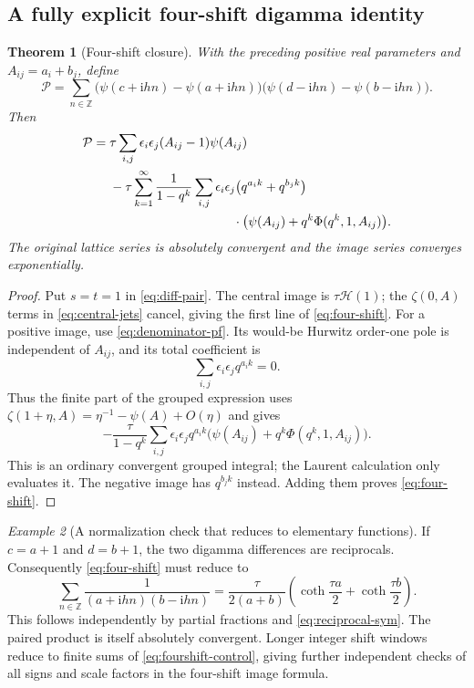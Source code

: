 \documentclass[11pt,a4paper]{article}
\numberwithin{equation}{section}
\newtheorem{theorem}{Theorem}[section]
\theoremstyle{definition}
\theoremstyle{remark}
\newtheorem{example}[theorem]{Example}
\newcommand{\ii}{\mathrm i}
\newcommand{\Z}{\mathbb Z}
\begin{document}
\subsection{A fully explicit four-shift digamma identity}
\begin{theorem}[Four-shift closure]\label{thm:fourshift}
With the preceding positive real parameters and
$A_{ij}=a_i+b_j$, define
\[
 \mathcal P=\sum_{n\in\Z}
   \bigl(\psi(c+\ii hn)-\psi(a+\ii hn)\bigr)
   \bigl(\psi(d-\ii hn)-\psi(b-\ii hn)\bigr).
\]
Then
\begin{equation}\label{eq:four-shift}
 \begin{split}
 \mathcal P={}&\tau\sum_{i,j}\epsilon_i\epsilon_j
                             (A_{ij}-1)\psi(A_{ij})\\
 &-\tau\sum_{k=1}^\infty\frac1{1-q^k}
     \sum_{i,j}\epsilon_i\epsilon_j
       \bigl(q^{a_i k}+q^{b_j k}\bigr)\\
 &\hspace{34mm}\cdot
        \bigl(\psi(A_{ij})+q^k\Phi(q^k,1,A_{ij})\bigr).
 \end{split}
\end{equation}
The original lattice series is absolutely convergent and the image
series converges exponentially.
\end{theorem}
\begin{proof}
Put $s=t=1$ in \eqref{eq:diff-pair}. The central image is
$\tau\mathcal H(1)$; the $\zeta(0,A)$ terms in
\eqref{eq:central-jets} cancel, giving the first line of
\eqref{eq:four-shift}. For a positive image, use
\eqref{eq:denominator-pf}. Its would-be Hurwitz order-one pole is
independent of $A_{ij}$, and its total coefficient is
\[
 \sum_{i,j}\epsilon_i\epsilon_j q^{a_i k}=0.
\]
Thus the finite part of the grouped expression uses
$\zeta(1+\eta,A)=\eta^{-1}-\psi(A)+O(\eta)$ and gives
\[
 -\frac{\tau}{1-q^k}\sum_{i,j}\epsilon_i\epsilon_j q^{a_i k}
            \bigl(\psi(A_{ij})+q^k\Phi(q^k,1,A_{ij})\bigr).
\]
This is an ordinary convergent grouped integral; the Laurent
calculation only evaluates it. The negative image has $q^{b_jk}$
instead. Adding them proves \eqref{eq:four-shift}.
\end{proof}

\begin{example}[A normalization check that reduces to elementary functions]
If $c=a+1$ and $d=b+1$, the two digamma differences are reciprocals.
Consequently \eqref{eq:four-shift} must reduce to
\begin{equation}\label{eq:fourshift-control}
 \sum_{n\in\Z}\frac1{(a+\ii hn)(b-\ii hn)}
 =\frac\tau{2(a+b)}
       \left(\coth\frac{\tau a}{2}+\coth\frac{\tau b}{2}\right).
\end{equation}
This follows independently by partial fractions and
\eqref{eq:reciprocal-sym}. The paired product is itself absolutely
convergent. Longer integer shift windows reduce to finite sums of
\eqref{eq:fourshift-control}, giving further independent checks of
all signs and scale factors in the four-shift image formula.
\end{example}
\end{document}
